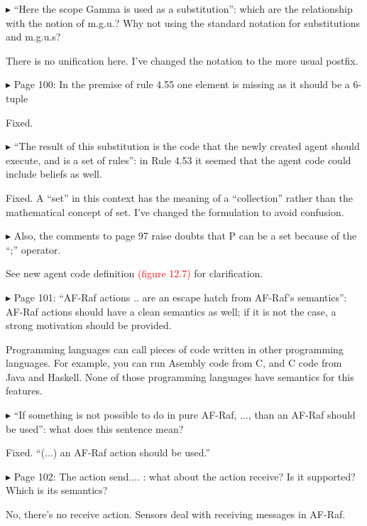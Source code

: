 \documentclass{article}
\newcommand*\R[1]{\textcolor{red}{#1}} %
\newenvironment{them}%
  {\bigskip\noindent\begingroup\color{blue}$\blacktriangleright$\enspace}%
  {\endgroup\par}
\begin{document}
\begin{them}
``Here the scope Gamma is used as a substitution'': which are the relationship
with the notion of m.g.u.? Why not using the standard notation for
substitutions and m.g.u.s?
\end{them}
There is no unification here. I've changed the notation to the more usual
postfix.

\begin{them}
Page 100:
In the premise of rule 4.55 one element is missing as it should be a 6-tuple
\end{them}
Fixed.

\begin{them}
``The result of this substitution is the code that the newly created agent
should execute, and is a set of rules'': in Rule 4.53 it seemed that the agent
code could include beliefs as well.
\end{them}
Fixed. A ``set'' in this context has the meaning of a ``collection'' rather than
the mathematical concept of set. I've changed the formulation to avoid
confusion.

\begin{them}
Also, the comments to page 97 raise doubts that P can be a set because of the
``;'' operator.
\end{them}
See new agent code definition \R{(figure 12.7)} for clarification.

\begin{them}
Page 101:
``AF-Raf actions .. are an escape hatch from AF-Raf's semantics'': AF-Raf actions
should have a clean semantics as well; if it is not the case, a strong
motivation should be provided.
\end{them}
Programming languages can call pieces of code written in other programming
languages. For example, you can run Asembly code from C, and C code from Java
and Haskell. None of those programming languages have semantics for this
features.

\begin{them}
``If something is not possible to do in pure AF-Raf, ..., than an AF-Raf should
be used'': what does this sentence mean?
\end{them}
Fixed. ``(...) an AF-Raf action should be used.''

\begin{them}
Page 102:
The action send.... : what about the action receive? Is it supported? Which is
its semantics?
\end{them}
No, there's no receive action. Sensors deal with receiving messages in AF-Raf.
\end{document}
